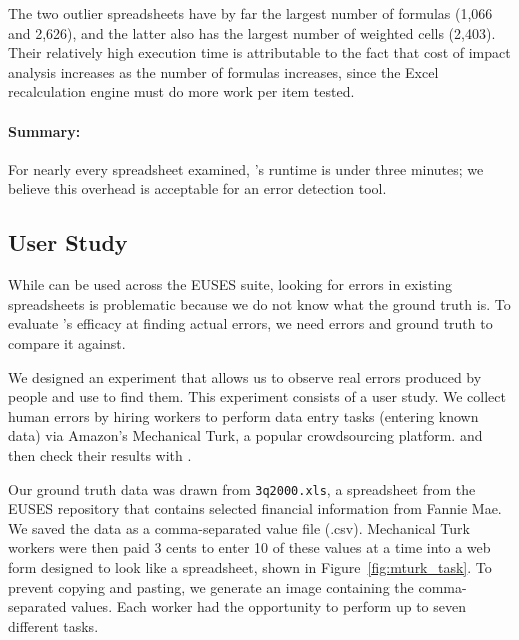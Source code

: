 The two outlier spreadsheets have by far the largest number of formulas
(1,066 and 2,626), and the latter also has the largest number of
weighted cells (2,403). Their relatively high execution time is
attributable to the fact that cost of impact analysis increases as the
number of formulas increases, since the Excel recalculation engine
must do more work per item tested.

\paragraph{Summary:} For nearly every spreadsheet
 examined, \checkcell{}'s runtime is under three minutes; we believe
 this overhead is acceptable for an error detection tool.





\subsection{User Study}
\label{sec:user_study}

While \checkcell{} can be used across the EUSES suite, looking for
errors in existing spreadsheets is problematic because we do not know
what the ground truth is. To evaluate \checkcell{}'s efficacy at
finding actual errors, we need errors and ground truth to compare it
against.

We designed an experiment that allows us to observe real errors
produced by people and use \checkcell{} to find them. This experiment
consists of a user study. We collect human errors by hiring workers to
perform data entry tasks (entering known data) via Amazon's Mechanical
Turk, a popular crowdsourcing platform. and then check their results
with \checkcell{}.

Our ground truth data was drawn from \texttt{3q2000.xls}, a
spreadsheet from the EUSES repository that contains selected financial
information from Fannie Mae. We saved the data as a comma-separated
value file (.csv). Mechanical Turk workers were then paid 3 cents to
enter 10 of these values at a time into a web form designed to look
like a spreadsheet, shown in Figure~\ref{fig:mturk_task}. To prevent
copying and pasting, we generate an image containing the
comma-separated values.  Each worker had the opportunity to perform up
to seven different tasks.

